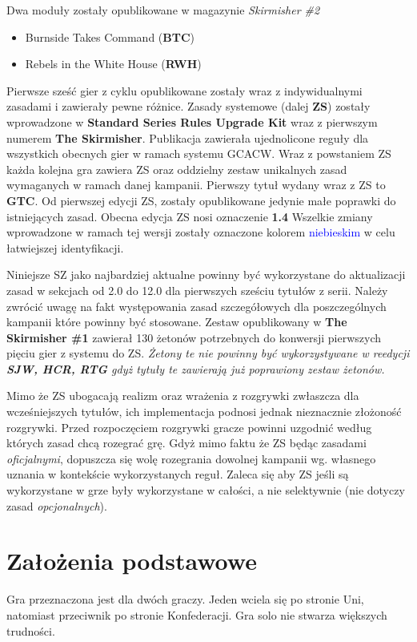 \documentclass[10pt,twoside,a4paper,table]{article}
\begin{document}
\begin{multicols*}{2}
\begin{itemize}
	\end{itemize}
	Dwa moduły zostały opublikowane w magazynie \textit{Skirmisher \#2}
	\begin{itemize}
		\item Burnside Takes Command (\textbf{BTC})
		\item Rebels in the White House (\textbf{RWH})
	\end{itemize}
	Pierwsze sześć gier z cyklu opublikowane zostały wraz z indywidualnymi zasadami i zawierały pewne różnice. Zasady systemowe (dalej \textbf{ZS}) zostały wprowadzone w \textbf{Standard Series Rules Upgrade Kit} wraz z pierwszym numerem \textbf{The Skirmisher}. Publikacja zawierała ujednolicone reguły dla wszystkich obecnych gier w ramach systemu GCACW. Wraz z powstaniem ZS każda kolejna gra zawiera ZS oraz oddzielny zestaw unikalnych zasad wymaganych w ramach danej kampanii. Pierwszy tytuł wydany wraz z ZS to \textbf{GTC}. Od pierwszej edycji ZS, zostały opublikowane jedynie małe poprawki do istniejących zasad. Obecna edycja ZS nosi oznaczenie \textbf{1.4} Wszelkie zmiany wprowadzone w ramach tej wersji zostały oznaczone kolorem \textcolor{blue}{niebieskim} w celu łatwiejszej identyfikacji.\par
	Niniejsze SZ jako najbardziej aktualne powinny być wykorzystane do aktualizacji zasad w sekcjach od 2.0 do 12.0 dla pierwszych sześciu tytułów z serii. Należy zwrócić uwagę na fakt występowania zasad szczegółowych dla poszczególnych kampanii które powinny być stosowane. Zestaw opublikowany w \textbf{The Skirmisher \#1} zawierał 130 żetonów potrzebnych do konwersji pierwszych pięciu gier z systemu do ZS. \textit{Żetony te nie powinny być wykorzystywane w reedycji \textbf{SJW, HCR, RTG} gdyż tytuły te zawierają już poprawiony zestaw żetonów.}\par
	Mimo że ZS ubogacają realizm oraz wrażenia z rozgrywki zwłaszcza dla wcześniejszych tytułów, ich implementacja podnosi jednak nieznacznie złożoność rozgrywki. Przed rozpoczęciem rozgrywki gracze powinni uzgodnić według których zasad chcą rozegrać grę. Gdyż mimo faktu że ZS będąc zasadami \textit{oficjalnymi}, dopuszcza się wolę rozegrania dowolnej kampanii wg. własnego uznania w kontekście wykorzystanych reguł. Zaleca się aby ZS jeśli są wykorzystane w grze były wykorzystane w całości, a nie selektywnie (nie dotyczy zasad \textit{opcjonalnych}). 
	\section{Założenia podstawowe}
	Gra przeznaczona jest dla dwóch graczy. Jeden wciela się po stronie Uni, natomiast przeciwnik po stronie Konfederacji. Gra solo nie stwarza większych trudności.

\end{multicols*}
\end{document}
